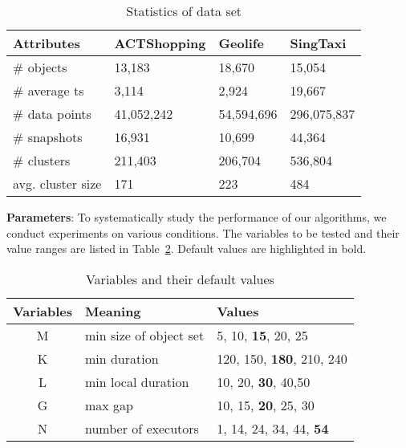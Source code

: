 \begin{table} [h]
\center
\small
\begin{tabular}{|l|l|l|l|}
\hline
 \textbf{Attributes}& \textbf{ACTShopping} &  \textbf{Geolife} &  \textbf{SingTaxi} \\ 
\hline 
\# objects  & 13,183 & 18,670 & 15,054\\ 
\hline
\# average ts & 3,114  & 2,924 & 19,667 \\ 
\hline
\# data points  & 41,052,242 & 54,594,696 & 296,075,837\\ 
\hline
\# snapshots  & 16,931 & 10,699 & 44,364\\ 
\hline
\# clusters  & 211,403  & 206,704& 536,804\\
\hline
avg. cluster size  & 171 & 223 & 484\\
\hline
\end{tabular}
\caption{Statistics of data set}
\label{exp:dataset}
\end{table}

\textbf{Parameters}: To systematically study the performance of
our algorithms, we conduct experiments on various conditions. The variables
to be tested and their value ranges are listed in Table~\ref{tbl:parameters}. 
Default values are highlighted in bold.
\begin{table}[h]
\small
\begin{tabular}{c|l|l}
\hline 
\textbf{Variables} & \textbf{Meaning} & \textbf{Values} \\ 
\hline 
M & min size of object set &  5, 10,  \textbf{15}, 20, 25 \\ 
\hline 
K & min duration & 120, 150, \textbf{180}, 210, 240 \\ 
\hline 
L & min local duration & 10, 20, \textbf{30}, 40,50 \\ 
\hline 
G & max gap & 10, 15, \textbf{20}, 25, 30 \\ 
\hline
N & number of executors & 1, 14, 24, 34, 44, \textbf{54}\\ 
\hline 
\end{tabular} 
\caption{Variables and their default values}
\label{tbl:parameters}
\end{table}

